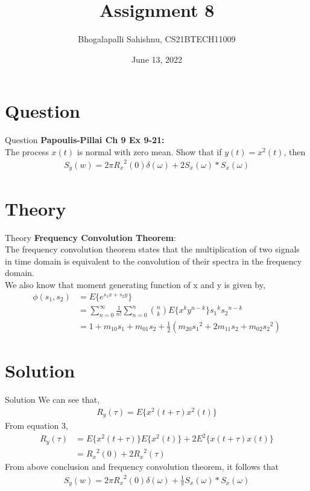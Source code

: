 \documentclass{beamer}
\title{Assignment 8}
\author{Bhogalapalli Sahishnu, CS21BTECH11009}
\date{June 13, 2022}
\begin{document}
\begin{frame}
    \titlepage
\end{frame}

\section{Question}
\begin{frame}{Question}
\textbf{Papoulis-Pillai Ch 9 Ex 9-21: }\\
The process $x(t)$ is normal with zero mean. Show that if $y(t) = x^2(t)$, then
\begin{align*}
    S_y(w) = 2\pi {R_{x}}^{2}(0) \delta(\omega) + 2 S_{x}(\omega) * S_x(\omega)
\end{align*}
\end{frame}

\section{Theory}
\begin{frame}{Theory}
\textbf{Frequency Convolution Theorem}: \\
The frequency convolution theorem states that the multiplication of two signals in time domain is equivalent to the convolution of their spectra in the frequency domain.\\
We also know that moment generating function of x and y is given by,
\begin{align}
    \phi(s_1,s_2) &= E\{e^{s_1x + s_2y}\}\\
                  &= \sum_{n=0}^{\infty} \frac{1}{n!} \sum_{n=0}^{n} {n \choose k} E\{x^k y^{n-k}\} {s_1}^k {s_2}^{n-k}\\
                  &= 1 + m_{10}s_1 + m_{01}s_2 + \frac{1}{2}(m_{20}{s_1}^2 + 2m_{11}s_2 + m_{02}{s_2}^2)
\end{align}
\end{frame}

\section{Solution}
\begin{frame}{Solution}
We can see that,
\begin{align*}
    R_{y}(\tau) = E\{x^2(t+\tau)x^2(t)\}
\end{align*}
From equation 3,
\begin{align*}
    R_y(\tau) &= E\{x^2(t + \tau)\} E\{x^2(t)\} + 2 E^2\{x(t+\tau) x(t)\}\\
              &= {R_{x}}^2(0) + 2{R_{x}}^2(\tau)
\end{align*}
From above conclusion and frequency convolution theorem, it follows that
\begin{align}
    S_y(w) = 2\pi {R_x}^2(0)\delta(\omega) + \frac{1}{\pi} S_x(\omega) * S_x(\omega)
\end{align}

    
\end{frame}
\end{document}
